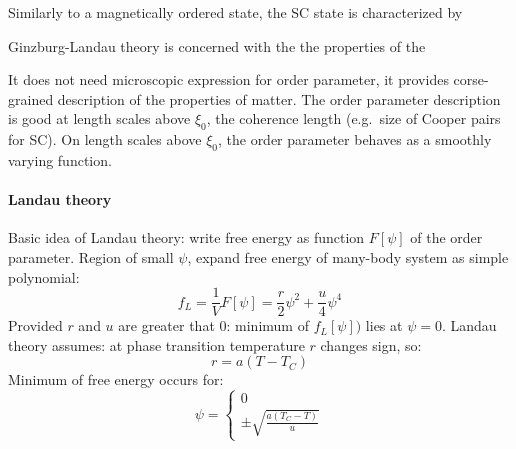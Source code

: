 \documentclass[../notes.tex]{subfiles}
\begin{document}

Similarly to a magnetically ordered state, the SC state is characterized by 

\cite{ginzburgTheorySuperconductivity1950}


Ginzburg-Landau theory is concerned with the the properties of the 

It does not need microscopic expression for order parameter, it provides corse-grained description of the properties of matter.
The order parameter description is good at length scales above \(\xi_0\), the coherence length (e.g.\ size of Cooper pairs for SC).
On length scales above \(\xi_0\), the order parameter behaves as a smoothly varying function.

\paragraph{Landau theory} 

Basic idea of Landau theory: write free energy as function \(F[\psi]\) of the order parameter.
Region of small \(\psi\), expand free energy of many-body system as simple polynomial:
\begin{equation}
	f_{L} = \frac{1}{V} F[\psi] = \frac{r}{2} \psi^2 + \frac{u}{4} \psi^4
\end{equation}
Provided \(r\) and \(u\) are greater that \(0\): minimum of \(f_L [\psi])\) lies at \(\psi = 0\).
Landau theory assumes: at phase transition temperature \(r\) changes sign, so:
\begin{equation}
	r = a(T - T_C)
\end{equation}
Minimum of free energy occurs for:
\begin{equation}
	\psi = \begin{cases}
		0 \\
		\pm \sqrt{\frac{a (T_C - T)}{u} }
	\end{cases}
\end{equation}



\end{document}
